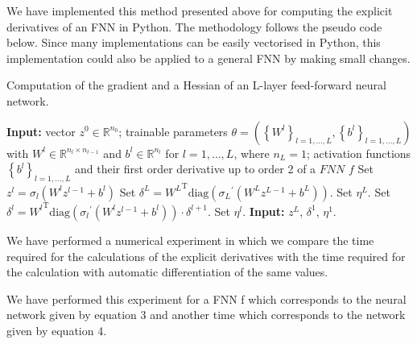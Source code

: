 We have implemented this method presented above for computing the explicit derivatives of an FNN in Python. The methodology follows the pseudo code below. Since many implementations can be easily vectorised in Python, this implementation could also be applied to a general FNN by making small changes.
\begin{algorithm}[H]
    \caption{Computation of the gradient and a Hessian of an L-layer feed-forward neural network.}
    \begin{algorithmic}[1]
        \State \textbf{Input:} vector $z^0 \in \mathbb{R}^{n_0}$; trainable parameters $\theta = \left(\left\{ W^l \right\}_{l = 1, \ldots, L}, \left\{ b^l \right\}_{l = 1, \ldots, L}\right)$ with $W^l \in \mathbb{R}^{n_l \times n_{l-1}}$ and $b^l \in \mathbb{R}^{n_l}$ for $l = 1, \ldots, L$, where $n_L = 1$; activation functions $\left\{ b^l \right\}_{l = 1, \ldots, L}$ and their first order derivative up to order 2 of a $FNN$ $f$
            \State Set $z^l = \sigma_l\left(W^l z^{l-1} + b^l\right)$
        \EndFor
        \State Set $\delta^{L} = {W^{L}}^{\mathrm{T}} \mathrm{diag}\left({\sigma_{L}}^{\prime}\left(W^{L} z^{L-1} + b^{L}\right)\right)$.
        \State Set $\eta^{L}$.
            \State Set $\delta^{l} = {W^{l}}^{\mathrm{T}} \mathrm{diag}\left({\sigma_{l}}^{\prime}\left(W^{l} z^{l-1} + b^{l}\right)\right) \cdot \delta^{l+1}$.
            \State Set $\eta^{l}$.
        \EndFor
        \State \textbf{Input:} $z^L$, $\delta^1$, $\eta^1$.
    \end{algorithmic}
\end{algorithm}
We have performed a numerical experiment in which we compare the time required for the calculations of the explicit derivatives with the time required for the calculation with automatic differentiation of the same values. 

We have performed this experiment for a FNN f which corresponds to the neural network given by equation 3 and another time which corresponds to the network given by equation 4. 

\begin{table}[H]\label{tab:advs ecplicit Resnet}
    \caption{Comparison of different types of neural networks.}
\end{table}